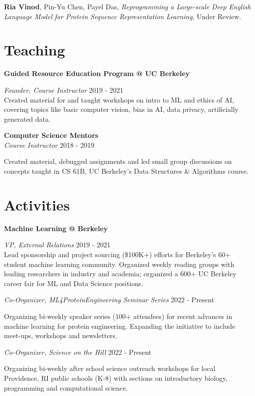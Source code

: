 \documentclass[mm,line]{res}
\begin{document}
\begin{resume}
{\bf Ria Vinod}, Pin-Yu Chen, Payel Das, \emph{Reprogramming a Large-scale Deep English Language Model for Protein Sequence Representation Learning}, Under Review.


\section{\sc Teaching}

{\bf Guided Resource Education Program @ UC Berkeley}

\vspace{-.4cm} 
{\em Founder, Course Instructor} \hfill {2019 - 2021} \\
Created material for and taught workshops on intro to ML and ethics of AI, covering topics like basic computer vision, bias in AI, data privacy, artificially generated data.


{\bf Computer Science Mentors} \\
{\em Course Instructor} \hfill {2018 - 2019} 

\vspace{-.4cm} 
Created material, debugged assignments and led small group discussions on concepts taught in CS 61B, UC Berkeley's Data Structures \& Algorithms course.

\section{\sc Activities}

{\bf Machine Learning @ Berkeley}

\vspace{-.4cm}
{\em VP, External Relations} \hfill {2019 - 2021}\\
Lead sponsorship and project sourcing (\$100K+) efforts for Berkeley's 60+ student machine learning community. Organized weekly reading groups with leading researchers in industry and academia; organized a 600+ UC Berkeley career fair for ML and Data Science positions. 


{\em Co-Organizer, ML4ProteinEngineering Seminar Series} \hfill {2022 - Present}

\vspace{-.4cm} 
{Organizing bi-weekly speaker series (100+ attendees) for recent advances in machine learning for protein engineering. Expanding the initiative to include meet-ups, workshops and newsletters.}


{\em Co-Organizer, Science on the Hill} \hfill { 2022 - Present}

\vspace{-.4cm}
{Organizing bi-weekly after school science outreach workshops for local Providence, RI public schools (K-8) with sections on introductory biology, programming and computational science.}


\end{resume}
\end{document}
